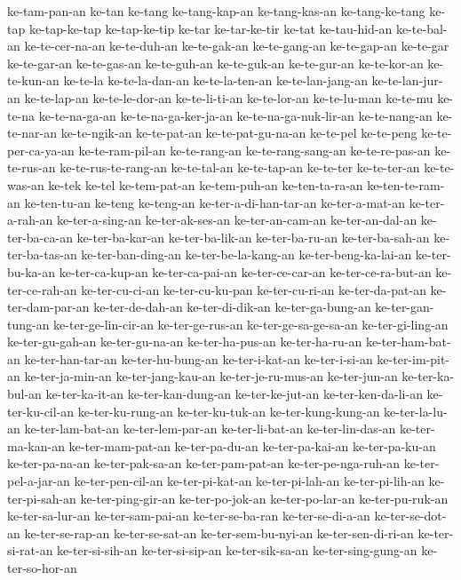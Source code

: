 {ke-tam-pan-an ke-tan ke-tang ke-tang-kap-an ke-tang-kas-an ke-tang-ke-tang
ke-tap ke-tap-ke-tap ke-tap-ke-tip ke-tar ke-tar-ke-tir ke-tat
ke-tau-hid-an ke-te-bal-an ke-te-cer-na-an ke-te-duh-an ke-te-gak-an
ke-te-gang-an ke-te-gap-an ke-te-gar ke-te-gar-an ke-te-gas-an
ke-te-guh-an ke-te-guk-an ke-te-gur-an ke-te-kor-an ke-te-kun-an ke-te-la
ke-te-la-dan-an ke-te-la-ten-an ke-te-lan-jang-an ke-te-lan-jur-an
ke-te-lap-an ke-te-le-dor-an ke-te-li-ti-an ke-te-lor-an ke-te-lu-man
ke-te-mu ke-te-na ke-te-na-ga-an ke-te-na-ga-ker-ja-an
ke-te-na-ga-nuk-lir-an ke-te-nang-an ke-te-nar-an ke-te-ngik-an
ke-te-pat-an ke-te-pat-gu-na-an ke-te-pel ke-te-peng ke-te-per-ca-ya-an
ke-te-ram-pil-an ke-te-rang-an ke-te-rang-sang-an ke-te-re-pas-an
ke-te-rus-an ke-te-rus-te-rang-an ke-te-tal-an ke-te-tap-an ke-te-ter
ke-te-ter-an ke-te-was-an ke-tek ke-tel ke-tem-pat-an ke-tem-puh-an
ke-ten-ta-ra-an ke-ten-te-ram-an ke-ten-tu-an ke-teng ke-teng-an
ke-ter-a-di-han-tar-an ke-ter-a-mat-an ke-ter-a-rah-an ke-ter-a-sing-an
ke-ter-ak-ses-an ke-ter-an-cam-an ke-ter-an-dal-an ke-ter-ba-ca-an
ke-ter-ba-kar-an ke-ter-ba-lik-an ke-ter-ba-ru-an ke-ter-ba-sah-an
ke-ter-ba-tas-an ke-ter-ban-ding-an ke-ter-be-la-kang-an
ke-ter-beng-ka-lai-an ke-ter-bu-ka-an ke-ter-ca-kup-an ke-ter-ca-pai-an
ke-ter-ce-car-an ke-ter-ce-ra-but-an ke-ter-ce-rah-an ke-ter-cu-ci-an
ke-ter-cu-ku-pan ke-ter-cu-ri-an ke-ter-da-pat-an ke-ter-dam-par-an
ke-ter-de-dah-an ke-ter-di-dik-an ke-ter-ga-bung-an ke-ter-gan-tung-an
ke-ter-ge-lin-cir-an ke-ter-ge-rus-an ke-ter-ge-sa-ge-sa-an
ke-ter-gi-ling-an ke-ter-gu-gah-an ke-ter-gu-na-an ke-ter-ha-pus-an
ke-ter-ha-ru-an ke-ter-ham-bat-an ke-ter-han-tar-an ke-ter-hu-bung-an
ke-ter-i-kat-an ke-ter-i-si-an ke-ter-im-pit-an ke-ter-ja-min-an
ke-ter-jang-kau-an ke-ter-je-ru-mus-an ke-ter-jun-an ke-ter-ka-bul-an
ke-ter-ka-it-an ke-ter-kan-dung-an ke-ter-ke-jut-an ke-ter-ken-da-li-an
ke-ter-ku-cil-an ke-ter-ku-rung-an ke-ter-ku-tuk-an ke-ter-kung-kung-an
ke-ter-la-lu-an ke-ter-lam-bat-an ke-ter-lem-par-an ke-ter-li-bat-an
ke-ter-lin-das-an ke-ter-ma-kan-an ke-ter-mam-pat-an ke-ter-pa-du-an
ke-ter-pa-kai-an ke-ter-pa-ku-an ke-ter-pa-na-an ke-ter-pak-sa-an
ke-ter-pam-pat-an ke-ter-pe-nga-ruh-an ke-ter-pel-a-jar-an
ke-ter-pen-cil-an ke-ter-pi-kat-an ke-ter-pi-lah-an ke-ter-pi-lih-an
ke-ter-pi-sah-an ke-ter-ping-gir-an ke-ter-po-jok-an ke-ter-po-lar-an
ke-ter-pu-ruk-an ke-ter-sa-lur-an ke-ter-sam-pai-an ke-ter-se-ba-ran
ke-ter-se-di-a-an ke-ter-se-dot-an ke-ter-se-rap-an ke-ter-se-sat-an
ke-ter-sem-bu-nyi-an ke-ter-sen-di-ri-an ke-ter-si-rat-an ke-ter-si-sih-an
ke-ter-si-sip-an ke-ter-sik-sa-an ke-ter-sing-gung-an ke-ter-so-hor-an
}
